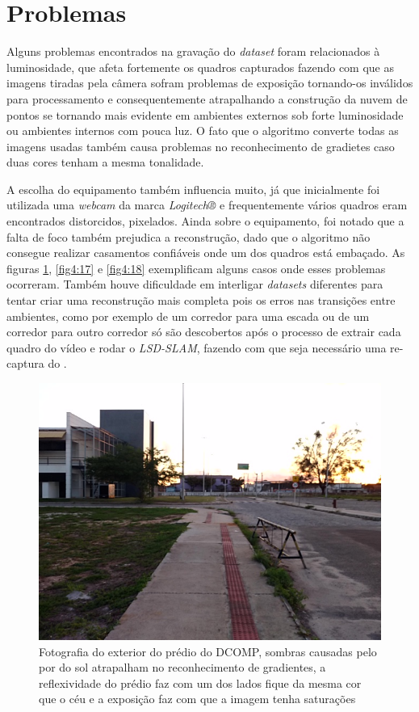 \section{Problemas}

Alguns problemas encontrados na gravação do \textit{dataset} foram relacionados à luminosidade, que afeta fortemente os quadros capturados fazendo com que as imagens tiradas pela câmera sofram problemas de exposição tornando-os inválidos para processamento e consequentemente atrapalhando a construção da nuvem de pontos se tornando mais evidente em ambientes externos sob forte luminosidade ou ambientes internos com pouca luz. O fato que o algoritmo converte todas as imagens usadas também causa problemas no reconhecimento de gradietes caso duas cores tenham a mesma tonalidade. 

A escolha do equipamento também influencia muito, já que inicialmente foi utilizada uma \textit{webcam} da marca \textit{Logitech®} e frequentemente vários quadros eram encontrados distorcidos, pixelados. Ainda sobre o equipamento, foi notado que a falta de foco também prejudica a reconstrução, dado que o algoritmo não consegue realizar casamentos confiáveis onde um dos quadros está embaçado. As figuras \ref{fig4:16}, \ref{fig4:17} e \ref{fig4:18}  exemplificam alguns casos onde esses problemas ocorreram. Também houve dificuldade em interligar  \textit{datasets} diferentes para tentar criar uma reconstrução mais completa pois os erros nas transições entre ambientes, como por exemplo de um corredor para uma escada ou de um corredor para outro corredor só são descobertos após o processo de extrair cada quadro do vídeo e rodar o \textit{LSD-SLAM}, fazendo com que seja necessário uma re-captura do . 

\begin{figure}[H]
	\centering
		\includegraphics[width= \textwidth]{Imagens/figura4-16.jpg}
		\caption{Fotografia do exterior do prédio do DCOMP, sombras causadas pelo por do sol atrapalham no reconhecimento de gradientes, a reflexividade do prédio faz com um dos lados fique da mesma cor que o céu e a exposição faz com que a imagem tenha saturações}
	\label{fig4:16}
\end{figure}

